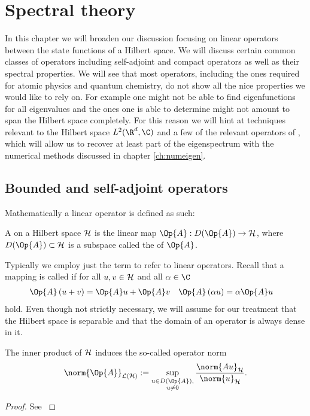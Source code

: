 \section{Spectral theory}
\label{sec:spectral}

In this chapter we will broaden our discussion focusing
on linear operators between the state functions of a Hilbert space.
We will discuss certain common classes of operators
including self-adjoint and compact operators as well as their spectral properties.
We will see that most operators, including the ones required for
atomic physics and quantum chemistry,
do not show all the nice properties we would like to rely on.
For example one might not be able to find eigenfunctions
for all eigenvalues and the ones one is able to determine
might not amount to span the Hilbert space completely.
For this reason we will hint at techniques
relevant to the Hilbert space $L^2(\R^d, \C)$
and a few of the relevant operators of \QM,
which will allow us to recover at least part of the eigenspectrum
with the numerical methods discussed in chapter \vref{ch:numeigen}.

\subsection{Bounded and self-adjoint operators}

Mathematically a linear operator is defined as such:
\begin{defn}
	A  on a Hilbert space $\mathcal{H}$
	is the linear map $\Op{A} : D(\Op{A}) \to \hilbert$,
	where $D(\Op{A}) \subset \hilbert$ is a subspace
	called the  of $\Op{A}$.
\end{defn}
Typically we employ just the term  to refer to linear operators.
Recall that a mapping is called  if
for all $u, v \in \mathcal{H}$ and all $\alpha \in \C$
\begin{align}
	\label{eqn:OperatorLinear}
	\Op{A}\left(u + v\right) &= \Op{A}u + \Op{A}v &
	\Op{A}\left(\alpha u\right) &= \alpha \Op{A}u
\end{align}
hold.
Even though not strictly necessary, we will assume for our treatment
that the Hilbert space is separable and that the domain of an operator
is always dense in it.

\newcommand{\opnorm}[1]{\norm{#1}_{\mathcal{L}(\hilbert)}}
\begin{prop}
	The inner product of $\mathcal{H}$ induces the so-called operator norm
	\[ \opnorm{\Op{A}} := \sup_{\substack{u \in D(\Op{A}),\\ u\neq0}}
		\frac{\norm{A u}_\hilbert}{\norm{u}_{\hilbert}}. \]
	\begin{proof}
		See \cite[Satz II.1.4]{Werner2011}
	\end{proof}
\end{prop}

